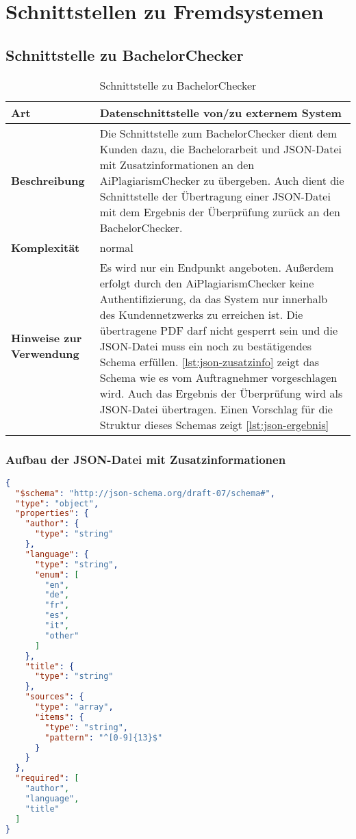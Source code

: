 \chapter{Schnittstellen zu Fremdsystemen}\label{ch:schnittstellen}


\section{Schnittstelle zu BachelorChecker}\label{sec:schnittstelle-bachelorchecker}

\begin{table}[H]
    \label{tab:schnittstelle-bachelorchecker}
    \begin{tabularx}{\textwidth}{|l|X|}
        \hline
        \textbf{Art}         & Datenschnittstelle von/zu externem System \\
        \hline
        \textbf{Beschreibung} & Die Schnittstelle zum BachelorChecker dient dem Kunden dazu, die Bachelorarbeit und JSON-Datei mit Zusatzinformationen an den AiPlagiarismChecker zu übergeben.
        Auch dient die Schnittstelle der Übertragung einer JSON-Datei mit dem Ergebnis der Überprüfung zurück an den BachelorChecker. \\
        \hline
        \textbf{Komplexität} & normal                                    \\
        \hline
        \textbf{Hinweise zur Verwendung} & Es wird nur ein Endpunkt angeboten.
        Außerdem erfolgt durch den AiPlagiarismChecker keine Authentifizierung, da das System nur innerhalb des Kundennetzwerks zu erreichen ist.
        Die übertragene PDF darf nicht gesperrt sein und die JSON-Datei muss ein noch zu bestätigendes Schema erfüllen.
        \autoref{lst:json-zusatzinfo} zeigt das Schema wie es vom Auftragnehmer vorgeschlagen wird.
        Auch das Ergebnis der Überprüfung wird als JSON-Datei übertragen.
        Einen Vorschlag für die Struktur dieses Schemas zeigt \autoref{lst:json-ergebnis}\\
        \hline
    \end{tabularx}
    \caption {Schnittstelle zu BachelorChecker}
\end{table}

\subsection{Aufbau der JSON-Datei mit Zusatzinformationen}\label{subsec:json-zusatzinfo}
\begin{lstlisting}[caption={JSON-Datei mit Zusatzinformationen},captionpos=b,label={lst:json-zusatzinfo}, language=json]
{
  "$schema": "http://json-schema.org/draft-07/schema#",
  "type": "object",
  "properties": {
    "author": {
      "type": "string"
    },
    "language": {
      "type": "string",
      "enum": [
        "en",
        "de",
        "fr",
        "es",
        "it",
        "other"
      ]
    },
    "title": {
      "type": "string"
    },
    "sources": {
      "type": "array",
      "items": {
        "type": "string",
        "pattern": "^[0-9]{13}$"
      }
    }
  },
  "required": [
    "author",
    "language",
    "title"
  ]
}
\end{lstlisting}

